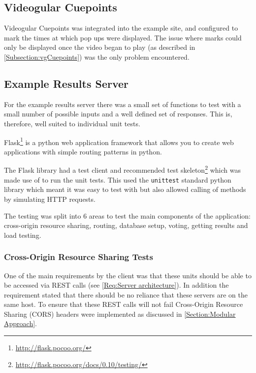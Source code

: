\subsection{Videogular Cuepoints}
\label{Subsection:Videogular Cuepoints in example}
\gls{Videogular} Cuepoints was integrated into the example site, and configured to mark the times at which pop ups were displayed. The issue where marks could only be displayed once the video began to play (as described in \autoref{Subsection:vgCuepoints}) was the only problem encountered.

\subsection{Example Results Server}
\label{Subsection:Example Results Server in example}

For the example results server there was a small set of functions to test with a small number of possible inputs and a well defined set of responses. This is, therefore, well suited to individual unit tests.

Flask\footnote{\url{http://flask.pocoo.org/}} is a python web application framework that allows you to create web applications with simple routing patterns in python.

The Flask library had a test client and recommended test skeleton\footnote{\url{http://flask.pocoo.org/docs/0.10/testing/}} which was made use of to run the unit tests. This used the \lstinline|unittest| standard python library which meant it was easy to test with but also allowed calling of methods by simulating HTTP requests.

The testing was split into 6 areas to test the main components of the application: cross-origin resource sharing, routing, database setup, voting, getting results and load testing.

\subsubsection{Cross-Origin Resource Sharing Tests}

One of the main requirements by the client was that these units should be able to be accessed via \gls{REST} calls (see \cref{Req:Server architecture}). In addition the requirement stated that there should be no reliance that these servers are on the same host. To ensure that these \gls{REST} calls will not fail Cross-Origin Resource Sharing (CORS) headers were implemented as discussed in \autoref{Section:Modular Approach}.

